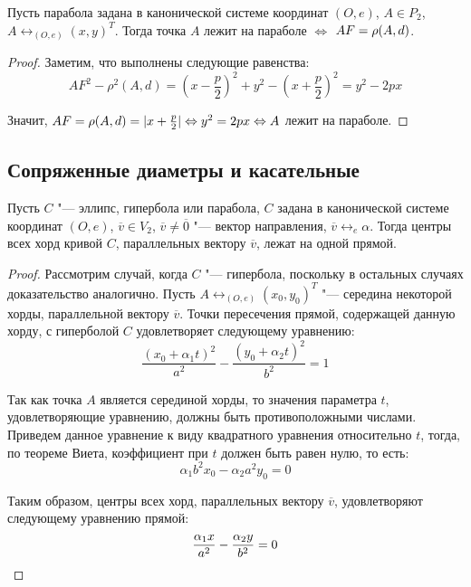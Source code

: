 \begin{theorem}
	Пусть парабола задана в канонической системе координат $(O, e)$, $A \in P_2$, $A \leftrightarrow_{(O, e)} (x, y)^T$. Тогда точка $A$ лежит на параболе $\Leftrightarrow$ $AF \hm{=} \rho(A, d)$.
\end{theorem}

\begin{proof}
	Заметим, что выполнены следующие равенства:
	\[AF^2 - \rho^2(A, d) = \left(x - \frac{p}{2}\right)^2 + y^2 - \left(x + \frac{p}{2}\right)^2 = y^2 - 2px\]
	
	Значит, $AF = \rho(A, d) = |x + \frac{p}{2}| \Leftrightarrow y^2 = 2px \Leftrightarrow A$ лежит на параболе.
\end{proof}

\subsection{Сопряженные диаметры и касательные}

\begin{theorem}
	Пусть $C$ "--- эллипс, гипербола или парабола, $C$ задана в канонической системе координат $(O, e)$, $\overline{v} \in V_2$, $\overline{v} \ne \overline 0$ "--- вектор направления, $\overline{v} \leftrightarrow_{e} \alpha$. Тогда центры всех хорд кривой $C$, параллельных вектору $\overline{v}$, лежат на одной прямой.
\end{theorem}

\begin{proof}
	Рассмотрим случай, когда $C$ "--- гипербола, поскольку в остальных случаях доказательство аналогично. Пусть $A \leftrightarrow_{(O, e)} (x_0, y_0)^T$ "--- середина некоторой хорды, параллельной вектору $\overline{v}$. Точки пересечения прямой, содержащей данную хорду, с гиперболой $C$ удовлетворяет следующему уравнению:
	\[\frac{(x_0 + \alpha_1 t)^2}{a^2} - \frac{(y_0 + \alpha_2 t)^2}{b^2} = 1\]
	
	Так как точка $A$ является серединой хорды, то значения параметра $t$, удовлетворяющие уравнению, должны быть противоположными числами. Приведем данное уравнение к виду квадратного уравнения относительно $t$, тогда, по теореме Виета, коэффициент при $t$ должен быть равен нулю, то есть:
	\[\alpha_1 b^2 x_0 - \alpha_2 a^2 y_0 = 0\]
	
	Таким образом, центры всех хорд, параллельных вектору $\overline{v}$, удовлетворяют следующему уравнению прямой:
	\[\frac{\alpha_1 x}{a^2} - \frac{\alpha_2 y}{b^2} = 0\qedhere\]
\end{proof}

